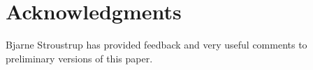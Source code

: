 \section{Acknowledgments}

Bjarne Stroustrup has provided feedback and very useful comments to preliminary versions of this paper.
